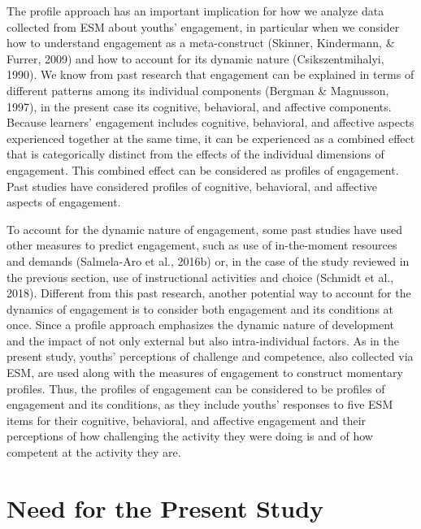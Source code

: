 \documentclass[]{msu-thesis}
\theoremstyle{definition}
\theoremstyle{definition}
\theoremstyle{definition}
\theoremstyle{remark}
\begin{document}
The profile approach has an important implication for how we analyze
data collected from ESM about youths' engagement, in particular when we
consider how to understand engagement as a meta-construct (Skinner,
Kindermann, \& Furrer, 2009) and how to account for its dynamic nature
(Csikszentmihalyi, 1990). We know from past research that engagement can
be explained in terms of different patterns among its individual
components (Bergman \& Magnusson, 1997), in the present case its
cognitive, behavioral, and affective components. Because learners'
engagement includes cognitive, behavioral, and affective aspects
experienced together at the same time, it can be experienced as a
combined effect that is categorically distinct from the effects of the
individual dimensions of engagement. This combined effect can be
considered as profiles of engagement. Past studies have considered
profiles of cognitive, behavioral, and affective aspects of engagement.

To account for the dynamic nature of engagement, some past studies have
used other measures to predict engagement, such as use of in-the-moment
resources and demands (Salmela-Aro et al., 2016b) or, in the case of the
study reviewed in the previous section, use of instructional activities
and choice (Schmidt et al., 2018). Different from this past research,
another potential way to account for the dynamics of engagement is to
consider both engagement and its conditions at once. Since a profile
approach emphasizes the dynamic nature of development and the impact of
not only external but also intra-individual factors. As in the present
study, youths' perceptions of challenge and competence, also collected
via ESM, are used along with the measures of engagement to construct
momentary profiles. Thus, the profiles of engagement can be considered
to be profiles of engagement and its conditions, as they include youths'
responses to five ESM items for their cognitive, behavioral, and
affective engagement and their perceptions of how challenging the
activity they were doing is and of how competent at the activity they
are.

\section{Need for the Present Study}\label{need-for-the-present-study}
\end{document}
